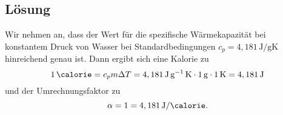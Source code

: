 \documentclass[german,12pt]{homework}
\newcommand{\sis}[1]{\,\si{#1}}
\begin{document}
    \subsection*{Lösung} Wir nehmen an, dass der Wert für die spezifische
    Wärmekapazität bei konstantem Druck von Wasser bei Standardbedingungen
    \(c_p = 4,181\sis{\joule\per\gram\kelvin}\) hinreichend genau ist. Dann
    ergibt sich eine Kalorie zu
    \[1\sis{\calorie} = c_pm{\Delta}T = 4,181\sis{\joule\per\gram\kelvin}
    \cdot 1\sis{\gram} \cdot 1\sis{\kelvin} = 4,181\sis{\joule}\]
    und der Umrechnungsfaktor zu
    \[\alpha = 1 = 4,181\sis{\joule\per\calorie}.\]
\end{document}
